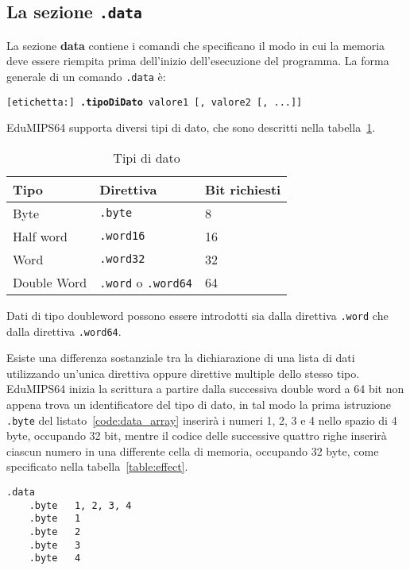 \documentclass[12pt]{report}
\newcommand{\EM}{EduMIPS64}
\begin{document}
\subsection{La sezione \texttt{.data}}
La sezione \textbf{data} contiene i comandi che specificano il modo in cui la
memoria deve essere riempita prima dell'inizio dell'esecuzione del programma. La
forma generale di un comando \texttt{.data} \`{e}:

\begin{center}
	\texttt{[etichetta:] \textbf{.tipoDiDato} valore1 [, valore2 [, ...]]}
\end{center}

\EM{} supporta diversi tipi di dato, che sono descritti nella tabella~\ref{table:datatypes}.

\begin{table}[!htb]
	\begin{centering}
		\begin{tabular}{lll}
			\hline
			\hline
			Tipo & Direttiva & Bit richiesti\\
			\hline
			Byte & \texttt{.byte} & 8\\
			Half word & \texttt{.word16} & 16\\
			Word & \texttt{.word32} & 32\\
			Double Word & \texttt{.word} o \texttt{.word64} & 64
		\end{tabular}
		\caption{Tipi di dato}
		\label{table:datatypes}
	\end{centering}
\end{table}

Dati di tipo doubleword possono essere introdotti sia dalla direttiva
\texttt{.word} che dalla direttiva \texttt{.word64}.

 Esiste una differenza sostanziale tra la dichiarazione di una lista di dati 
utilizzando un'unica direttiva oppure direttive multiple dello stesso tipo.
\EM{} inizia la scrittura a partire dalla successiva double word a 64 bit non appena 
trova un identificatore del tipo di dato, in tal modo la prima istruzione \texttt{.byte} 
del listato~\ref{code:data_array} inserir\`{a} i numeri 1, 2, 3 e 4 nello spazio di 4 byte, 
occupando 32 bit, mentre il codice delle successive quattro righe inserir\`{a} ciascun numero 
in una differente cella di memoria, occupando 32 byte, come specificato nella tabella~\ref{table:effect}.

\begin{lstlisting}[caption={Byte adiacenti}, label={code:data_array}, style={mips}]
	.data
	.byte	1, 2, 3, 4
	.byte	1
	.byte	2
	.byte	3
	.byte	4
\end{lstlisting}
\end{document}
